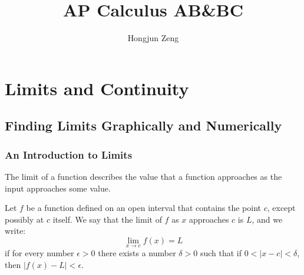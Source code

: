 \documentclass[12pt]{article}
\theoremstyle{beautifulthm}
\begin{document}
\title{AP Calculus AB\&BC}
\author{Hongjun Zeng}
\maketitle
\lipsum[1-10] 
\newpage
\tableofcontents

\newpage
\section{Limits and Continuity}
\subsection{Finding Limits Graphically and Numerically}
\subsubsection*{An Introduction to Limits}

The limit of a function describes the value that a function approaches as the input approaches some value.


\begin{Definition}{}{}
Let \( f \) be a function defined on an open interval that contains the point \( c \), except possibly at \( c \) itself. We say that the limit of \( f \) as \( x \) approaches \( c \) is \( L \), and we write:
\[
\lim_{x \to c} f(x) = L
\]
if for every number \( \epsilon > 0 \) there exists a number \( \delta > 0 \) such that if \( 0 < |x - c| < \delta \), then \( |f(x) - L| < \epsilon \).
\end{Definition}
\end{document}
